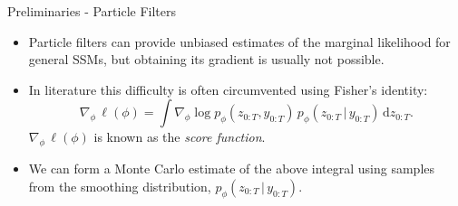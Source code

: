 \documentclass[10pt, aspectratio=1610]{beamer}
\newcommand{\given}{\,|\,}
\newcommand{\dd}{\mathrm{d}}
\begin{document}
    \begin{frame}{Preliminaries - Particle Filters}
      \begin{itemize}[<+->]
        \item Particle filters can provide unbiased estimates of the marginal likelihood for general SSMs, but obtaining its gradient is usually not possible.
        \item In literature this difficulty is often circumvented using Fisher's identity:
          \begin{equation}
            \nabla_\phi \, \ell(\phi) = \int \nabla_\phi \log p_{\phi}(z_{0:T}, y_{0:T}) \, p_\phi(z_{0:T} \given y_{0:T}) \, \dd z_{0:T}.
          \end{equation}
          $\nabla_\phi \, \ell(\phi)$ is known as the \emph{score function}.
        \item We can form a Monte Carlo estimate of the above integral using samples from the smoothing distribution, $p_\phi(z_{0:T} \given y_{0:T})$.
      \end{itemize} 
    \end{frame}
\end{document}
